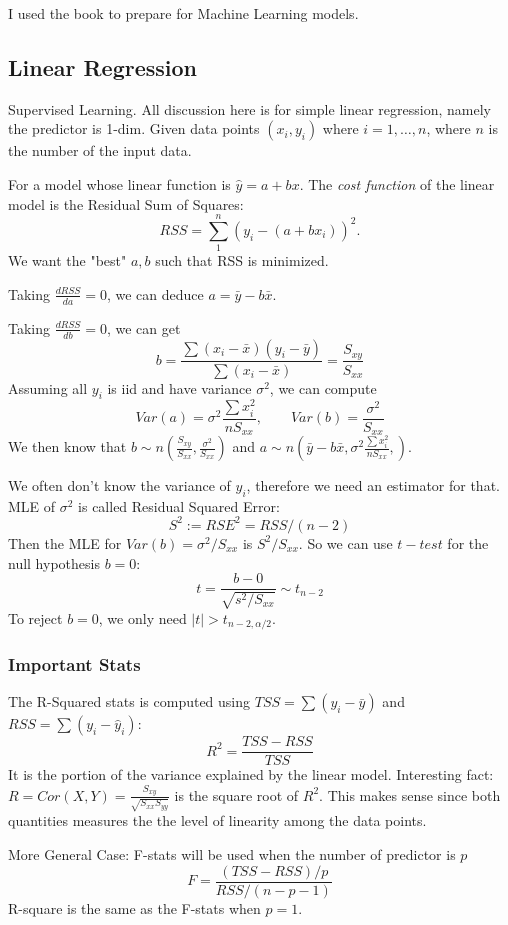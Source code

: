 \documentclass[12pt]{amsart}
\numberwithin{equation}{section}
\theoremstyle{plain}
\theoremstyle{definition}
\begin{document}
I used the book \cite{ISLR} to prepare for Machine Learning models.

\subsection{Linear Regression}

Supervised Learning. All discussion here is for simple linear regression, namely the predictor is 1-dim. Given data points $(x_i, y_i)$ where $i = 1,\ldots, n$, where $n$ is the number of the input data.

For a model whose linear function is $\hat y = a+bx$. The {\em cost function} of the linear model is the Residual Sum of Squares: $$RSS = \sum_1^n(y_i-(a+bx_i))^2.$$
We want the "best" $a, b$ such that RSS is minimized.

Taking $\frac{dRSS}{da}=0$, we can deduce $a=\bar{y}-b\bar{x}$.

Taking $\frac{dRSS}{db}=0$, we can get 
$$
b=\frac{\sum(x_i-\bar{x})(y_i-\bar{y})}{\sum(x_i-\bar{x})}=\frac{S_{xy}}{S_{xx}}
$$
Assuming all $y_i$ is iid and have variance $\sigma^2$, we can compute
$$
Var(a) = \sigma^2\frac{\sum x_i^2}{nS_{xx}}, \qquad Var(b)=\frac{\sigma^2}{S_{xx}}
$$
We then know that $b\sim n(\frac{S_{xy}}{S_{xx}},\frac{\sigma^2}{S_{xx}})$ and $a\sim n(\bar{y}-b\bar{x},\sigma^2\frac{\sum x_i^2}{nS_{xx}},)$.

We often don't know the variance of $y_i$, therefore we need an estimator for that. MLE of $\sigma^2$ is called Residual Squared Error:
$$
S^2:= RSE^2 = RSS/(n-2)
$$
Then the MLE for $Var(b)=\sigma^2/S_{xx}$ is $S^2/S_{xx}$. So we can use $t-test$ for the null hypothesis $b = 0$:
$$
t = \frac{b-0}{\sqrt{s^2/S_{xx}}} \sim t_{n-2}
$$
To reject $b=0$, we only need $|t|>t_{n-2,\alpha/2}$.

\subsubsection{Important Stats}
The R-Squared stats is computed using $TSS=\sum(y_i-\bar y)$ and $RSS=\sum(y_i - \hat y_i)$:
$$
R^2=\frac{TSS-RSS}{TSS}
$$
It is the portion of the variance explained by the linear model. Interesting fact: 
$R = Cor(X,Y)=\frac{S_{xy}}{\sqrt{S_{xx}S_{yy}}}$ is the square root of $R^2$. This makes sense since both quantities measures the the level of linearity among the data points.

More General Case: F-stats will be used when the number of predictor is $p$
$$
F = \frac{(TSS-RSS)/p}{RSS/(n-p-1)}
$$
R-square is the same as the F-stats when $p=1$.
\end{document}
